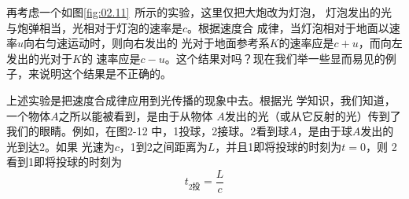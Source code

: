 再考虑一个如图\ref{fig:02.11}~所示的实验，这里仅把大炮改为灯泡，
灯泡发出的光与炮弹相当，光相对于灯泡的速率是$c$。根据速度合
成律，当灯泡相对于地面以速率$u$向右匀速运动时，则向右发出的
光对于地面参考系$K$的速率应是$c+u$，而向左发出的光对于$K$的
速率应是$c-u$。这个结果对吗？现在我们举一些显而易见的例
子，来说明这个结果是不正确的。

上述实验是把速度合成律应用到光传播的现象中去。根据光
学知识，我们知道，一个物体$A$之所以能被看到，是由于从物体
$A$发出的光（或从它反射的光）传到了我们的眼睛。例如，在图2-12
中，1投球，2接球。2看到球$A$，是由于球$A$发出的光到达2。如果
光速为$c$，1到2之间距离为$L$，并且1即将投球的时刻为$t=0$，则
2看到1即将投球的时刻为
\begin{equation*}
    t_{2\text{投}}=\frac{L}{c}
\end{equation*}